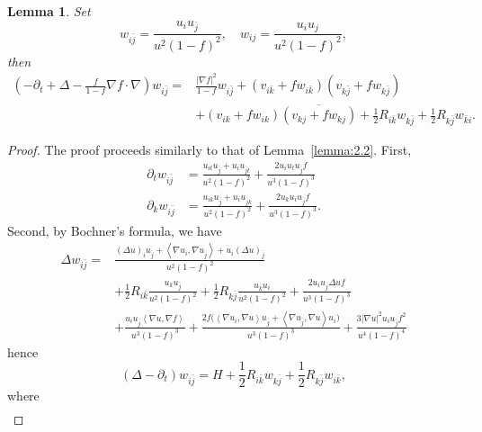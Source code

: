 \documentclass{amsart}
\newtheorem{lemma}[theorem]{Lemma}
\theoremstyle{definition}
\theoremstyle{remark}
\numberwithin{equation}{section}
\begin{document}
\begin{lemma}
    Set \[w_{i \bar{j}}=\frac{u_i u_{\bar{j}}}{u^2(1-f)^2}, \quad w_{i j}=\frac{u_i u_j}{u^2(1-f)^2},\]
    then
    \[
        \begin{aligned}
         \left(-\partial_t+\Delta-\frac{f}{1-f} \nabla f \cdot \nabla\right) w_{i \bar{j}}=&\frac{|\nabla f|^2}{1-f} w_{i \bar{j}}+\left(v_{i \bar{k}}+f w_{i \bar{k}}\right)\left(v_{k \bar{j}}+f w_{k \bar{j}}\right) \\
        & +\left(v_{i k}+f w_{i k}\right) \overline{\left(v_{kj}+f w_{kj}\right)}+\frac{1}{2} R_{i \bar{k}} w_{k \bar{j}}+\frac{1}{2} R_{k \bar{j}} w_{\bar{k} i}.
        \end{aligned}
    \]
\end{lemma}

\begin{proof}
    The proof proceeds similarly to that of Lemma~\ref{lemma:2.2}. First,
      \[
          \begin{aligned}
          \partial_t w_{i\bar{j}} &=
            \frac{u_{it}u_{\bar{j}}+u_{i}u_{\bar{j}t}}{u^{2}(1-f)^{2}}
            +
            \frac{2u_{i}u_{t}u_{\bar{j}}f}{u^{3}(1-f)^{3}}\\
          \partial_k w_{i\bar{j}} &=\frac{u_{ik}u_{\bar{j}}+u_{i}u_{\bar{j}k}}{u^{2}(1-f)^{2}}+\frac{2u_{k}u_{i}u_{\bar{j}}f}{u^{3}(1-f)^3}.
          \end{aligned}
      \]
    Second, by Bochner's formula, we have
    \[
    \begin{aligned}
      \Delta w_{i \bar{j}}  
        =&\frac{(\Delta u)_i u_{\bar{j}}+\left\langle\nabla u_i, \nabla u_{\bar{j}}\right\rangle+u_i\left(\Delta u\right)_{\bar{j}}}{u^2(1-f)^2} \\
      & +\frac{1}{2} R_{i \bar{k}} \frac{u_k u_{\bar{j}}}{u^2(1-f)^2}
        +\frac{1}{2} R_{k \bar{j}} \frac{u_{\bar{k}} u_i}{u^2(1-f)^2}
        +\frac{2 u_i u_{\bar{j}} \Delta u f}{u^3(1-f)^3} \\
      & +\frac{u_i u_{\bar{j}}\left\langle\nabla u,\nabla f\right\rangle}{u^3 (1-f)^3}
        +\frac{2 f\big(\left\langle \nabla u_i, \nabla u\right\rangle u_{\bar{j}}+\left\langle\nabla u_{\bar{j}}, \nabla u\right\rangle u_i\big)}{u^3(1-f)^3} 
      +\frac{3 | \nabla u|^2 u_i u_{\bar{j}} f^2}{u^4(1-f)^4}
    \end{aligned}
    \]
    hence
    \[
      (\Delta-\partial_t) w_{i \bar{j}}=H+\frac{1}{2} R_{i \bar{k}} w_{k \bar{j}}+\frac{1}{2} R_{k \bar{j}} w_{i \bar{k}},
    \]
    where
    \[
      \begin{aligned}

\end{aligned}\]
\end{proof}
\end{document}
